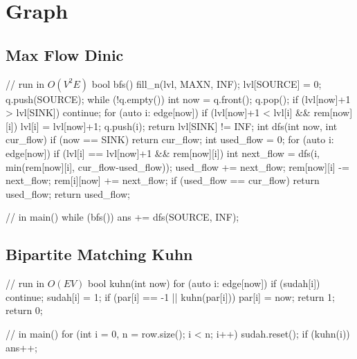\section{Graph}

\subsection{Max Flow Dinic}
\begin{cppcode}
	// run in $O(V^2E)$
	bool bfs() {
		fill_n(lvl, MAXN, INF);
		lvl[SOURCE] = 0;
		q.push(SOURCE);
		while (!q.empty()) {
				int now = q.front();
				q.pop();
				if (lvl[now]+1 > lvl[SINK]) continue;
				for (auto i: edge[now]) {
						if (lvl[now]+1 < lvl[i] && rem[now][i]) {
								lvl[i] = lvl[now]+1;
								q.push(i);
		}}}
		return lvl[SINK] != INF;
	}
	int dfs(int now, int cur_flow) {
		if (now == SINK) return cur_flow;
		int used_flow = 0;
		for (auto i: edge[now]) {
				if (lvl[i] == lvl[now]+1 && rem[now][i]) {
						int next_flow = dfs(i, min(rem[now][i], cur_flow-used_flow));
						used_flow += next_flow;
						rem[now][i] -= next_flow;
						rem[i][now] += next_flow;
						if (used_flow == cur_flow) return used_flow;
		}}
		return used_flow;
	}

	// in main()
	while (bfs()) {
		ans += dfs(SOURCE, INF);
	}
\end{cppcode}

\subsection{Bipartite Matching Kuhn}
\begin{cppcode}
	// run in $O(EV)$
	bool kuhn(int now) {
		for (auto i: edge[now]) {
			if (sudah[i]) continue;
			sudah[i] = 1;
			if (par[i] == -1 || kuhn(par[i])) {
				par[i] = now;
				return 1;
			}
		}
		return 0;
	}
	
	// in main()
	for (int i = 0, n = row.size(); i < n; i++) {
		sudah.reset();
		if (kuhn(i)) ans++;
	}
\end{cppcode}

